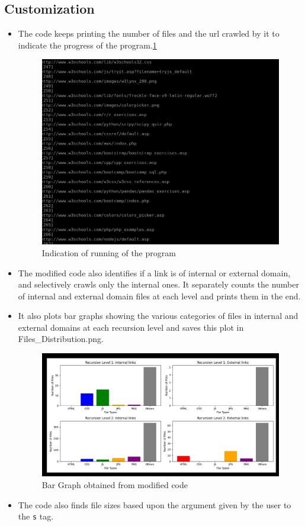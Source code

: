 \documentclass{article}
\begin{document}
\subsection*{Customization}
\begin{itemize}
    \item The code keeps printing the number of files and the url crawled by it to indicate the progress of the program.\ref{fig:Design4}
    \begin{figure}[H]
    \centering
    \includegraphics[scale=0.3]{RunningOfTheProgram.png}
    \caption{Indication of running of the program}
    \label{fig:Design4}
\end{figure}
    \item The modified code also identifies if a link is of internal or external domain, and selectively crawls only the internal ones. It separately counts the number of internal and external domain files at each level and prints them in the end.
    \item It also plots bar graphs showing the various categories of files in internal and external domains at each recursion level and saves this plot in Files\_Distribution.png.
    \begin{figure}[H]
    \centering
    \includegraphics[scale=0.3]{BarGraphs.png}
    \caption{Bar Graph obtained from modified code}
    \label{fig:Design2}
\end{figure}
    \item The code also finds file sizes based upon the argument given by the user to the \texttt{s} tag. 
\end{itemize}
\end{document}
